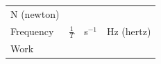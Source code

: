 {\begin{center}
\begin{xtabular*}{\mytablewidth}[t]{|p{10\mystarwidth}|p{10\mystarwidth}|p{10\mystarwidth}|p{10\mystarwidth}|}
    
        N (newton)%
     \tabularnewline{}
    
    
        Frequency &
    
    
        
                \begin{math}\frac{1}{T}\end{math}
               &
    
    
        s\begin{math}{}^{-1}\end{math} &
    
    
        Hz (hertz)%
     \tabularnewline{}
    
    
        Work &
    
    
        

\end{xtabular*}
\end{center}}
